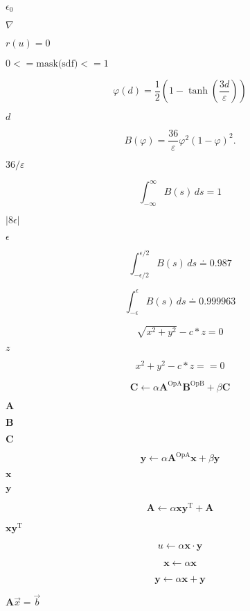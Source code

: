 \documentclass{article}
\begin{document}
$\epsilon_0$
\pagebreak

$ \nabla $
\pagebreak

$r(u) = 0$
\pagebreak

$0 <= \mbox{mask(sdf)} <= 1$
\pagebreak

\[ \varphi(d) = \frac{1}{2}\left( 1 - \tanh\left( \frac{3d}{\varepsilon} \right) \right) \]
\pagebreak

$d$
\pagebreak

\[ B(\varphi) = \frac{36}{\varepsilon} \varphi^2 (1-\varphi)^2. \]
\pagebreak

$36/\varepsilon$
\pagebreak

\[ \int_{-\infty}^\infty B(s) \, ds = 1 \]
\pagebreak

$ |8 \epsilon| $
\pagebreak

$ \epsilon $
\pagebreak

\[ \int_{-\epsilon/2}^{\epsilon/2} B(s) \, ds \doteq 0.987 \]
\pagebreak

\[ \int_{-\epsilon}^{\epsilon} B(s) \, ds \doteq 0.999963 \]
\pagebreak

\[ \sqrt{x^2 + y^2} - c * z = 0 \]
\pagebreak

$ z $
\pagebreak

\[ x^2 + y^2 - c * z == 0 \]
\pagebreak

\[ \mathbf{C} \leftarrow \alpha \mathbf{A}^{\mathrm{OpA}} \mathbf{B}^{\mathrm{OpB}} + \beta \mathbf{C} \]
\pagebreak

$ \mathbf{A} $
\pagebreak

$ \mathbf{B} $
\pagebreak

$ \mathbf{C} $
\pagebreak

\[ \mathbf{y} \leftarrow \alpha \mathbf{A}^{\mathrm{OpA}} \mathbf{x} + \beta \mathbf{y} \]
\pagebreak

$ \mathbf{x} $
\pagebreak

$ \mathbf{y} $
\pagebreak

\[ \mathbf{A} \leftarrow \alpha \mathbf{x} \mathbf{y}^{\mathrm{T}} + \mathbf{A} \]
\pagebreak

$ \mathbf{x} \mathbf{y}^{\mathrm{T}} $
\pagebreak

\[ u \leftarrow \alpha \mathbf{x} \cdot \mathbf{y} \]
\pagebreak

\[ \mathbf{x} \leftarrow \alpha \mathbf{x} \]
\pagebreak

\[ \mathbf{y} \leftarrow \alpha \mathbf{x} + \mathbf{y} \]
\pagebreak

$ \mathbf{A} \vec{x} = \vec{b} $
\pagebreak
\end{document}
